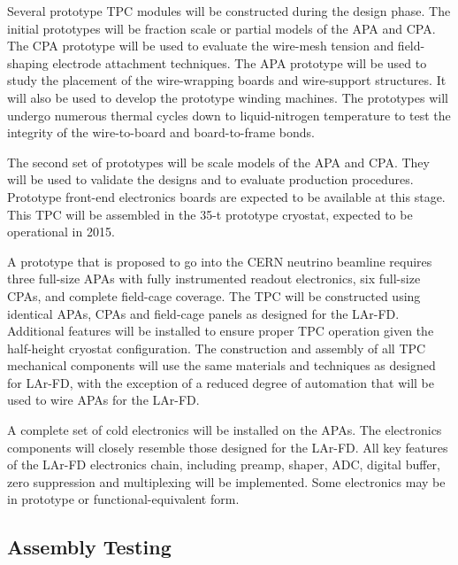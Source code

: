 Several prototype TPC modules will be constructed during the 
design phase.  The initial prototypes will be fraction scale or 
partial models of the APA and CPA.  The CPA prototype will be used 
to evaluate the wire-mesh tension and field-shaping electrode 
attachment techniques.   The APA prototype will be used to study 
the placement of the wire-wrapping boards and wire-support structures.  
It will also be used to develop the prototype winding machines.  
The prototypes will undergo numerous thermal cycles down to 
liquid-nitrogen temperature to test the integrity of the wire-to-board
and board-to-frame bonds.

The second set of prototypes will be scale models of the 
APA and CPA.  They will be used to validate the designs and 
to evaluate production procedures.  Prototype front-end electronics 
boards are expected to be available at this stage.  This TPC will be assembled in the 35-t prototype cryostat, expected to be operational in 2015.

A prototype that is proposed to go into the CERN neutrino beamline requires three full-size APAs with fully instrumented readout electronics, six full-size CPAs, and complete field-cage coverage.  The TPC will be constructed using identical APAs, CPAs and field-cage panels as designed for the LAr-FD.  Additional features will be installed to ensure proper TPC operation given the half-height cryostat configuration. The construction and assembly of all TPC mechanical components will use the same materials and techniques as designed for LAr-FD, with the exception of a reduced degree of automation that will be used to wire APAs for the LAr-FD.

A complete set of cold electronics will be installed on the APAs.  The electronics components will closely resemble those designed for the LAr-FD. All key features of the LAr-FD electronics chain, including preamp, shaper, ADC, digital buffer, zero suppression and multiplexing will be implemented.  Some  electronics  may be in prototype or functional-equivalent form.

\subsection{Assembly Testing}
\label{sec:ce-checkout-test}

